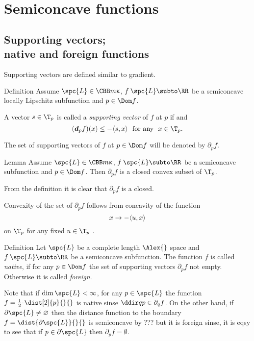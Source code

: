 \chapter{Semiconcave functions}

\section{Supporting vectors;\\
native and foreign functions}

Supporting vectors are defined similar to gradient.

\begin{thm}{Definition}\label{def-support} Assume $\spc{L}\in\CBB m\kappa$, $f\:\spc{L}\subto\RR$ be a semiconcave locally Lipschitz subfunction 
and $p\in\Dom f$.

A vector $s\in \T_p$ is called a \emph{supporting vector} of $f$ at $p$ if and
\[(\d_p f)(x)\le -\langle s , x\rangle\ \ \hbox{for any}\ \ x\in \T_p.\]
\end{thm}

The set of supporting vectors of $f$ at $p\in\Dom f$ will be denoted by $\partial_p f$.

\begin{thm}{Lemma}
Assume $\spc{L}\in\CBB m\kappa$, $f\:\spc{L}\subto\RR$ be a semiconcave subfunction and $p\in
\Dom f$.
Then $\partial_p f$ is a closed convex subset of $\T_p$. 
\end{thm}

From the definition it is clear that $\partial_p f$ is a closed.

Convexity of the set of $\partial_p f$ follows from concavity of the function 
\[x\to -\<u,x\>\] 
on $\T_p$ for any fixed $u\in\T_p$ .
\qeds

\begin{thm}{Definition}\label{def:native}
Let $\spc{L}$ be a complete length $\Alex{}$ space
and $f\:\spc{L}\subto\RR$ be a semiconcave subfunction.
The function $f$ is called \emph{native}, 
if for any $p\in\Dom f$ the set of supporting vectors $\partial_pf$ not empty.
Otherwise it is called \emph{foreign}.
\end{thm}


Note that if $\dim \spc{L}<\infty$, for any $p\in \spc{L}$ the function $f=\tfrac{1}{2}\cdot\dist[2]{p}{}{}$ is native
sinse $\ddir q p\in\partial_q f$.
On the other hand, if $\partial \spc{L}\not=\emptyset$ then the distance function to the boundary 
$f=\dist{\partial \spc{L}}{}{}$ is semiconcave by ??? but it is foreign sinse, it is eqsy to see that if $p\in\partial \spc{L}$ then $\partial_p f=\emptyset$.


